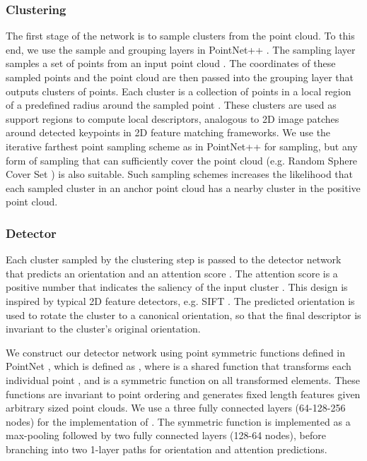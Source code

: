 \documentclass[runningheads]{llncs}
\begin{document}
\subsubsection{Clustering}
The first stage of the network is to sample clusters from the point cloud. To this end, we use the sample and grouping layers in PointNet++ \cite{pointnetpp}. The sampling layer samples a set of points  
from an input point cloud . The coordinates of these sampled points and the point cloud are then passed into the grouping layer that outputs  clusters of points.
Each cluster  is a collection of points in a local region of a predefined radius  around the sampled point . These clusters are used as support regions to compute local descriptors, analogous to 2D image patches around detected keypoints in 2D feature matching frameworks. We use the iterative farthest point sampling scheme as in PointNet++ for sampling, but any form of sampling that can sufficiently cover the point cloud (e.g. Random Sphere Cover Set \cite{Elbaz2017CVPR}) is also suitable. Such sampling schemes increases the likelihood that each sampled cluster in an anchor point cloud has a nearby cluster in the positive point cloud.

\subsubsection{Detector}
Each cluster  sampled by the clustering step is passed to the detector network that predicts an orientation  and an attention score . The attention score  is a positive number that indicates the saliency of the input cluster . This design is inspired by typical 2D feature detectors, e.g. SIFT \cite{SIFT}. The predicted orientation is used to rotate the cluster to a canonical orientation, so that the final descriptor is invariant to the cluster's original orientation.

We construct our detector network using point symmetric functions defined in PointNet \cite{pointnet}, which is defined as , where  is a shared function that transforms each individual point , and  is a symmetric function on all transformed elements. These functions are invariant to point ordering and generates fixed length features given arbitrary sized point clouds. We use a three fully connected layers (64-128-256 nodes) for the implementation of . The symmetric function  is implemented as a max-pooling followed by two fully connected layers (128-64 nodes), before branching into two 1-layer paths for orientation and attention predictions.
\end{document}
